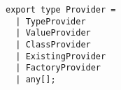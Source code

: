 \begin{verbatim}
export type Provider =
  | TypeProvider
  | ValueProvider
  | ClassProvider
  | ExistingProvider
  | FactoryProvider
  | any[];
\end{verbatim}
